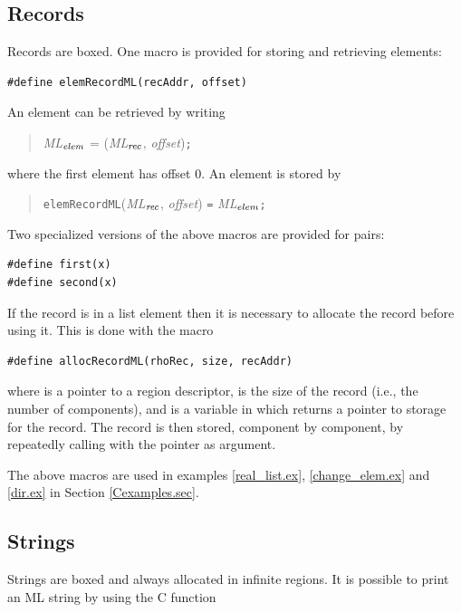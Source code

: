 \documentclass[12pt]{book}
\begin{document}
\subsection{Records}
Records are boxed. One macro is provided for storing and retrieving
elements:

\begin{verbatim}
#define elemRecordML(recAddr, offset)
\end{verbatim}

\noindent An element can be retrieved by writing 
\begin{quote}
\emph{ML}$_{\emph{elem}}$ = (\emph{ML}$_{\emph{rec}}$, \emph{offset})\texttt{;}
\end{quote}
\noindent
where the first element has offset 0. An element is stored by
\begin{quote}
\texttt{elemRecordML}(\emph{ML}$_{\emph{rec}}$, \emph{offset}) \texttt{=} \emph{ML}$_{\emph{elem}}$\texttt{;}
\end{quote}
\noindent
\noindent Two specialized versions of the above macros are provided for
pairs:

\begin{verbatim}
#define first(x)
#define second(x)
\end{verbatim}

If the record is in a list element then it is necessary to allocate the record
before using it. This is done with the macro

\begin{verbatim}
#define allocRecordML(rhoRec, size, recAddr)
\end{verbatim}

\noindent
where  is a pointer to a region descriptor, 
 is the size of
the record (i.e., the number of components), and 
is a variable in which  returns a pointer to
storage for the record. The record is then stored, component by component,
by repeatedly  calling  with the pointer as argument.


The above macros are used in examples \ref{real_list.ex},
\ref{change_elem.ex} and \ref{dir.ex} in Section \ref{Cexamples.sec}.

\subsection{Strings}
Strings are boxed and always allocated in infinite regions. It is possible
to print an ML string by using the C function
\end{document}
